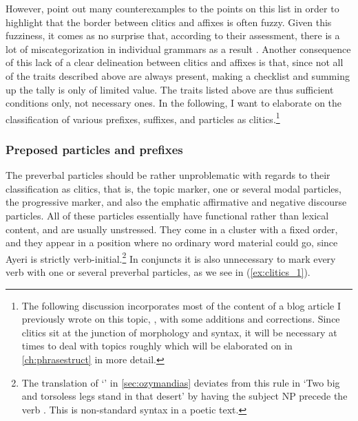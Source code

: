 However, \citet{spencerluis2012} point out many counterexamples to the points
on this list in order to highlight that the border between clitics and affixes
is often fuzzy. Given this fuzziness, it comes as no surprise that, according to
their assessment, there is a lot of miscategorization in individual grammars as
a result \citep[107]{spencerluis2012}. Another consequence of this lack of a
clear delineation between clitics and affixes is that, since not all of the
traits described above are always present, making a checklist and summing up
the tally is only of limited value. The traits listed above are thus sufficient
conditions only, not necessary ones. In the following, I want to elaborate on
the classification of various prefixes, suffixes, and particles as
clitics.\footnote{The following discussion incorporates most of the content of
a blog article I previously wrote on this topic, \citet{benung:clitics}, with
some additions and corrections. Since clitics sit at the junction of morphology
and syntax, it will be necessary at times to deal with topics roughly which
will be elaborated on in \autoref{ch:phrasestruct} in more detail.}

\subsubsection{Preposed particles and prefixes}

\label{clitics_preverb} The preverbal particles should be rather unproblematic 
with regards to their classification as clitics, that is,
the topic marker, one or several modal
particles, the progressive marker, and
also the emphatic affirmative and negative discourse particles. All of these particles essentially have functional rather than
lexical content, and are usually unstressed. They come in a cluster with a fixed
order, and they appear in a position where no ordinary word material could go,
since Ayeri is strictly verb-initial.\footnote{The translation of
`' in \autoref{sec:ozymandias} deviates from this
rule in 
  `Two big and torsoless legs stand in that desert' by having the
subject NP  precede the verb
. This is non-standard syntax in a poetic
text.} In conjuncts it is also unnecessary to mark every verb with one or
several preverbal particles, as we see in (\ref{ex:clitics_1}).

